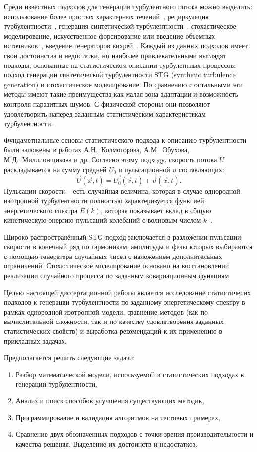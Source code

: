 Среди известных подходов для генерации турбулентного потока можно выделить:
использование более простых характерных течений~\cite{schluter2004large},
рециркуляция турбулентности~\cite{lund1998generation,spalart2006direct,shur2011rapid,araya2011dynamic},
генерация синтетической турбулентности~\cite{Kraichnan70,Smirnov2001,huang2010general,shur2014synthetic,adamian2011efficient,batten2004interfacing},
стохастическое моделирование,
искусственное форсирование или введение объемных источников~\cite{gritskevich2012embedded,spille2001generation},
введение генераторов вихрей~\cite{terracol2016investigation}.
Каждый из данных подходов имеет свои достоинства и недостатки, но наиболее привлекательными выглядят
подходы, основанные на статистическом описании турбулентных процессов:
подход генерации синтетической турбулентности STG (synthetic turbulence generation) и стохастическое моделирование.
По сравнению с остальными эти методы имеют такие преимущества как малая зона адаптации и возможность контроля паразитных шумов.
С физической стороны они позволяют удовлетворить наперед заданным статистическим характеристикам турбулентности.  

Фундаметнальные основы статистического подхода к описанию турбулентности были заложены в работах А.Н.~Колмогорова, А.М.~Обухова, М.Д.~Миллионщикова и др. 
Согласно этому подходу, скорость потока $U$ раскладывается на сумму средней $U_0$ и пульсационной $u$
составляющих:
$$\vec{U}\left(\vec{x}, t\right) = \vec{U_0}\left(\vec{x}, t\right)  + \vec{u}\left(\vec{x}, t\right).$$
Пульсации скорости -- есть случайная величина, которая в случае однородной изотропной
турбулентности полностью характеризуется функцией энергетического спектра $E(k)$,
которая показывает вклад в общую кинетическую энергию пульсаций колебаний с волновым числом $k$~\cite{pope2000turbulent}.

Широко распространённый STG-подход заключается в разложении пульсации скорости в конечный ряд по гармоникам,
амплитуды и фазы которых выбираются с помощью генератора случайных чисел с наложением дополнительных ограничений.
Стохастическое моделирование основано на восстановлении реализации случайного процесса по заданным ковариационным функциям.

Целью настоящей диссертационной работы является исследование статистичесих подходов к генерации турбулентности
по заданному энергетическому спектру в рамках однородной изотропной модели,
сравнение методов (как по вычислительной сложности, так и по качеству удовлетворения заданных статистических свойств) и 
выработка рекомендаций к их применению в прикладных задачах.

Предполагается решить следующие задачи:
\begin{enumerate}
	\item Разбор математической модели, используемой в статистических подходах к генерации турбулентности,
	\item Анализ и поиск способов улучшения существующих методик,
	\item Программирование и валидация алгоритмов на тестовых примерах,
	\item Сравнение двух обозначенных подходов с точки зрения производительности и качества решения. Выделение их достоинств и недостатков.
\end{enumerate}
